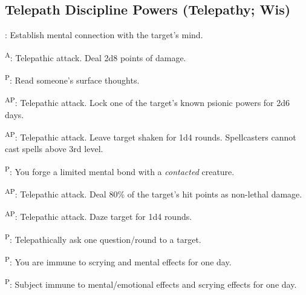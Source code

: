 \subsection{Telepath Discipline Powers {\normalsize(Telepathy; Wis)}}
\begin{enumerate*}
\item {}: Establish mental connection with the target's mind.

      \textsuperscript{A}: Telepathic attack. Deal 2d8 points of damage.

\item {}\textsuperscript{P}: Read someone's surface thoughts.

      \textsuperscript{AP}: Telepathic attack. Lock one of the target's known psionic powers for 2d6 days.

\item {}\textsuperscript{AP}: Telepathic attack. Leave target shaken for 1d4 rounds. Spellcasters cannot cast spells above 3rd level.

\item {}\textsuperscript{P}: You forge a limited mental bond with a \emph{contacted} creature.

      \textsuperscript{AP}: Telepathic attack. Deal 80\% of the target's hit points as non-lethal damage.

\item {}\textsuperscript{AP}: Telepathic attack. Daze target for 1d4 rounds.

      \textsuperscript{P}: Telepathically ask one question/round to a target.

\item
\item {}\textsuperscript{P}: You are immune to scrying and mental effects for one day.
\item {}\textsuperscript{P}: Subject immune to mental/emotional effects and scrying effects for one day.
\item
\end{enumerate*}